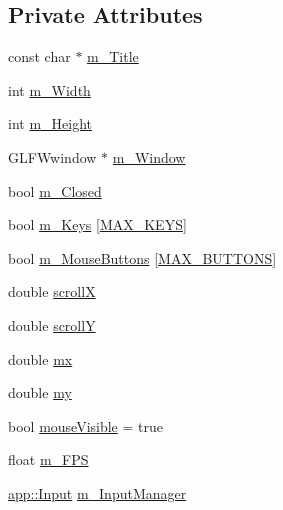 \subsection*{Private Attributes}
\begin{DoxyCompactItemize}
\item 
const char $\ast$ \hyperlink{classspork_1_1graphics_1_1_window_a92e53320ace67c18ebeb2aeedaca642e}{m\+\_\+\+Title}
\item 
int \hyperlink{classspork_1_1graphics_1_1_window_aa9f8adb1d8e8663f8325ee940235b98e}{m\+\_\+\+Width}
\item 
int \hyperlink{classspork_1_1graphics_1_1_window_aab31788244145ca5bf23791c167c22e0}{m\+\_\+\+Height}
\item 
G\+L\+F\+Wwindow $\ast$ \hyperlink{classspork_1_1graphics_1_1_window_a63f713a27b94dfb0b2aec195de135917}{m\+\_\+\+Window}
\item 
bool \hyperlink{classspork_1_1graphics_1_1_window_aa639e1215ea2ee6304771668bf8b8645}{m\+\_\+\+Closed}
\item 
bool \hyperlink{classspork_1_1graphics_1_1_window_af46d08eafc336b3db36e27a2700e0086}{m\+\_\+\+Keys} \mbox{[}\hyperlink{input_8h_a3077ecca3770bdee50e6a17dfb55d002}{M\+A\+X\+\_\+\+K\+E\+YS}\mbox{]}
\item 
bool \hyperlink{classspork_1_1graphics_1_1_window_a764dc38ed3635c4f52c9f84398f7a4c4}{m\+\_\+\+Mouse\+Buttons} \mbox{[}\hyperlink{input_8h_a8bb0c7f312bb8665c3377a061dae552c}{M\+A\+X\+\_\+\+B\+U\+T\+T\+O\+NS}\mbox{]}
\item 
double \hyperlink{classspork_1_1graphics_1_1_window_a9e178f6a4378404048d26e4f560b76c8}{scrollX}
\item 
double \hyperlink{classspork_1_1graphics_1_1_window_a618aaab346cbb5e98f6a4b1f034ea56b}{scrollY}
\item 
double \hyperlink{classspork_1_1graphics_1_1_window_aebba1c26ee5c686524a1a0697ade5038}{mx}
\item 
double \hyperlink{classspork_1_1graphics_1_1_window_a5fea429ed7a514e1f1d7b51a5318e34d}{my}
\item 
bool \hyperlink{classspork_1_1graphics_1_1_window_abd1aee80a6fb58ccc507115dbdacbfd1}{mouse\+Visible} = true
\item 
float \hyperlink{classspork_1_1graphics_1_1_window_a801e3f961f859f6e9e9aa23487640c9e}{m\+\_\+\+F\+PS}
\item 
\hyperlink{classspork_1_1app_1_1_input}{app\+::\+Input} \hyperlink{classspork_1_1graphics_1_1_window_a3f2781c21d888ebf81828e66464378cb}{m\+\_\+\+Input\+Manager}
\end{DoxyCompactItemize}

